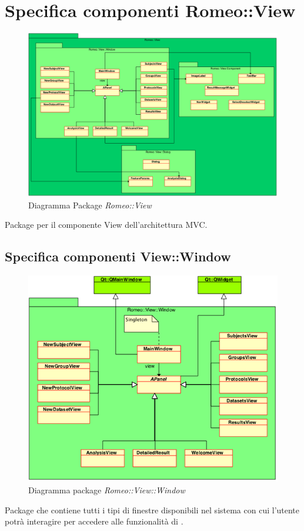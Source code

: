 \color{black}
\section{Specifica componenti Romeo::View}
\label{specificaView}
\begin{figure} [!h]
\centering
	\includegraphics[width=0.8\linewidth] {../Specifica_Tecnica/Content/Immagini/RelazioniView.png}
			\caption{Diagramma Package \textsl{Romeo::View}}
			\label{comp_romeo::view}
\end{figure}
Package\g{} per il componente View dell'architettura MVC.
\pagebreak
\subsection{Specifica componenti View::Window}
\label{specificaWindow}
\begin{figure}[!h]

			\includegraphics[width=0.8\linewidth]{../Specifica_Tecnica/Content/Immagini/Window.png}
			\caption{Diagramma package \textsl{Romeo::View::Window}}
			\label{comp_romeo::view::window}
\end{figure}
Package\g{} che contiene tutti i tipi di finestre disponibili nel sistema con cui l'utente potrà interagire per accedere alle funzionalità di \project.
\pagebreak
